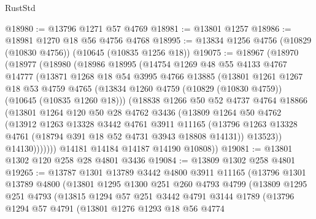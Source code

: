\begin{lexlean}{RustStd}
\begin{coremodule}
@18980 := @13796 @1271 @57 @4769
@18981 := @13801 @1257
@18986 := @18981 @1270 @18 @56 @4756 @4768
@18995 := @13834 @1256 @4756 (@10829 (@10830 @4756)) (@10645 (@10835 @1256 @18))
@19075 := @18967
    (@18970
      (@18977
        (@18980
          (@18986
            @18995
            (@14754
              @1269
              @48
              @55
              @4133
              @4767
              @14777
              (@13871
                @1268
                @18
                @54
                @3995
                @4766
                @13885
                (@13801
                  @1261
                  @1267
                  @18
                  @53
                  @4759
                  @4765
                  (@13834 @1260 @4759 (@10829 (@10830 @4759)) (@10645 (@10835 @1260 @18)))
                  (@18838
                    @1266
                    @50
                    @52
                    @4737
                    @4764
                    @18866
                    (@13801
                      @1264
                      @120
                      @50
                      @28
                      @4762
                      @3436
                      (@13809
                        @1264
                        @50
                        @4762
                        (@13912
                          @1263
                          @13328
                          @3442
                          @4761
                          @3911
                          @11165
                          (@13796
                            @1263
                            @13328
                            @4761
                            (@18794 @391 @18 @52 @4731 @3943 @18808 @14131))
                          @13523))
                      @14130)))))))
        @14181
        @14184
        @14187
        @14190
        @10808))
@19081 := @13801 @1302 @120 @258 @28 @4801 @3436
@19084 := @13809 @1302 @258 @4801
@19265 := @13787
    @1301
    @13789
    @3442
    @4800
    @3911
    @11165
    (@13796
      @1301
      @13789
      @4800
      (@13801
        @1295
        @1300
        @251
        @260
        @4793
        @4799
        (@13809
          @1295
          @251
          @4793
          (@13815
            @1294
            @57
            @251
            @3442
            @4791
            @3144
            @1789
            (@13796
              @1294
              @57
              @4791
              (@13801
                @1276
                @1293
                @18
                @56
                @4774

\end{coremodule}
\end{lexlean}
